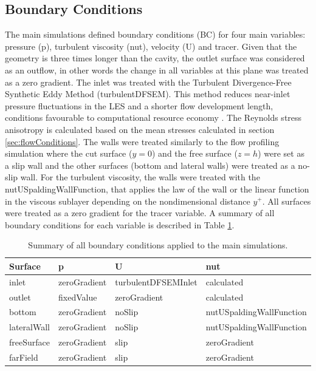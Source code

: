 \documentclass[../main.tex]{subfiles}
\begin{document}
\subsection{Boundary Conditions}
\label{sec:BC}
The main simulations defined boundary conditions (BC) for four main variables: pressure (p), turbulent viscosity (nut), velocity (U) and tracer. Given that the geometry is three times longer than the cavity, the outlet surface was considered as an outflow, in other words the change in all variables at this plane was treated as a zero gradient. The inlet was treated with the Turbulent Divergence-Free Synthetic Eddy Method (turbulentDFSEM). This method reduces  near-inlet pressure fluctuations in the LES and a shorter flow development length, conditions favourable to computational resource economy \cite{poletto2013}. The Reynolds stress anisotropy is calculated based on the mean stresses calculated in section \ref{sec:flowConditions}. The walls were treated similarly to the flow profiling simulation where the cut surface ($y=0$) and the free surface ($z=h$) were set as a slip wall and the other surfaces (bottom and lateral walls) were treated as a no-slip wall. For the turbulent viscosity, the walls were treated with the nutUSpaldingWallFunction, that applies the law of the wall or the linear function in the viscous sublayer depending on the nondimensional distance $y^+$. All surfaces were treated as a zero gradient for the tracer variable. A summary of all boundary conditions for each variable is described in Table \ref{tab:boundaryConditions}.
\begin{table}[!h]
\centering
\caption{Summary of all boundary conditions applied to the main simulations.}
\label{tab:boundaryConditions}
\begin{tabular}{llll}
Surface     & p            & U                   & nut                         \\ \hline
inlet       & zeroGradient & turbulentDFSEMInlet & calculated \\
outlet      & fixedValue   & zeroGradient        & calculated                  \\
bottom      & zeroGradient & noSlip              & nutUSpaldingWallFunction    \\
lateralWall & zeroGradient & noSlip              & nutUSpaldingWallFunction    \\
freeSurface & zeroGradient & slip                & zeroGradient                \\
farField    & zeroGradient & slip                & zeroGradient               
\end{tabular}
\end{table}
\end{document}
